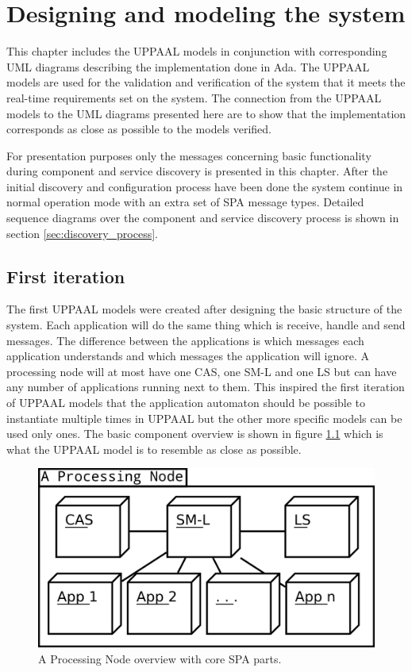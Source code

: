 \chapter{Designing and modeling the system}\label{ch:uppaal_models}
This chapter includes the UPPAAL models in conjunction with corresponding UML
diagrams describing the implementation done in Ada. The UPPAAL models are used
for the validation and verification of the system that it meets the real-time
requirements set on the system. The connection from the UPPAAL models to the
UML diagrams presented here are to show that the implementation corresponds as
close as possible to the models verified.

For presentation purposes only the messages concerning basic functionality
during component and service discovery is presented in this chapter. After the
initial discovery and configuration process have been done the system continue
in normal operation mode with an extra set of SPA message types. Detailed
sequence diagrams over the component and service discovery process is shown in
section \ref{sec:discovery_process}.

\section{First iteration}
The first UPPAAL models were created after designing the basic structure of the
system. Each application will do the same thing which is receive, handle
and send messages. The difference between the applications is which
messages each application understands and which messages the application will
ignore. A processing node will at most have one CAS, one SM-L and one LS
but can have any number of applications running next to them. This inspired the
first iteration of UPPAAL models that the application automaton should be
possible to instantiate multiple times in UPPAAL but the other more specific
models can be used only ones. The basic component overview is shown in figure
\ref{fig:processing_node_overview} which is what the UPPAAL model is to
resemble as close as possible.

\begin{figure}[h]
    \centering
    \includegraphics[width=\textwidth]{figures/processing_node_overview}
    \caption{A Processing Node overview with core SPA parts.}
    \label{fig:processing_node_overview}
\end{figure}

